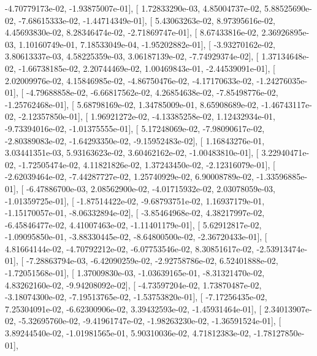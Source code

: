 \documentclass{article}
\begin{document}
         -4.70779173e-02,  -1.93875007e-01],
       [  1.72833290e-03,   4.85004737e-02,   5.88525690e-02,
         -7.68615333e-02,  -1.44714349e-01],
       [  5.43063263e-02,   8.97395616e-02,   4.45693830e-02,
          8.28346474e-02,  -2.71869747e-01],
       [  8.67433816e-02,   2.36926895e-03,   1.10160749e-01,
          7.18533049e-04,  -1.95202882e-01],
       [ -3.93270162e-02,   3.80613337e-03,   4.58225359e-03,
          3.06187139e-02,  -7.74929374e-02],
       [  1.37134648e-02,  -1.66738185e-02,   2.20744469e-02,
          1.00469843e-01,  -2.44539091e-01],
       [  2.02009976e-02,   4.15846985e-02,  -4.86750476e-02,
         -4.17170633e-02,  -1.24276035e-01],
       [ -4.79688858e-02,  -6.66817562e-02,   4.26854638e-02,
         -7.85498776e-02,  -1.25762468e-01],
       [  5.68798169e-02,   1.34785009e-01,   8.65908689e-02,
         -1.46743117e-02,  -2.12357850e-01],
       [  1.96921272e-02,  -4.13385258e-02,   1.12432934e-01,
         -9.73394016e-02,  -1.01375555e-01],
       [  5.17248069e-02,  -7.98090617e-02,  -2.80389083e-02,
         -1.64293350e-02,  -9.15952483e-02],
       [  1.16843276e-01,   3.03441351e-03,   5.93163623e-02,
          3.60462162e-02,  -1.00483810e-01],
       [  3.22940471e-02,  -1.72505474e-02,   4.11821826e-02,
          1.37243450e-02,  -2.12316079e-01],
       [ -2.62039464e-02,  -7.44287727e-02,   1.25740929e-02,
          6.90008789e-02,  -1.33596885e-01],
       [ -6.47886700e-03,   2.08562900e-02,  -4.01715932e-02,
          2.03078059e-03,  -1.01359725e-01],
       [ -1.87514422e-02,  -9.68793751e-02,   1.16937179e-01,
         -1.15170057e-01,  -8.06332894e-02],
       [ -3.85464968e-02,   4.38217997e-02,  -6.45846477e-02,
          4.41007463e-02,  -1.11401179e-01],
       [  5.62912817e-02,  -1.09095850e-01,  -3.88330445e-02,
         -8.64800500e-02,  -2.36720433e-01],
       [  4.81664144e-02,  -4.70792212e-02,  -6.07753546e-02,
          8.30851617e-02,  -2.53913474e-01],
       [ -7.28863794e-03,  -6.42090259e-02,  -2.92758786e-02,
          6.52401888e-02,  -1.72051568e-01],
       [  1.37009830e-03,  -1.03639165e-01,  -8.31321470e-02,
          4.83262160e-02,  -9.94208092e-02],
       [ -4.73597204e-02,   1.73870487e-02,  -3.18074300e-02,
         -7.19513765e-02,  -1.53753820e-01],
       [ -7.17256435e-02,   7.25304091e-02,  -6.62300906e-02,
          3.39432593e-02,  -1.45931464e-01],
       [  2.34013907e-02,  -5.32695760e-02,  -9.41961747e-02,
         -1.98263230e-02,  -1.36591524e-01],
       [  3.89244540e-02,  -1.01981565e-01,   5.90310036e-02,
          4.71812383e-02,  -1.78127850e-01],
\end{document}
